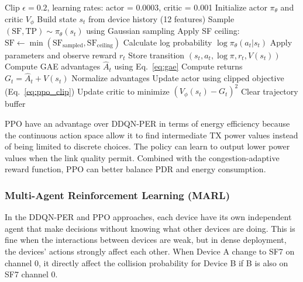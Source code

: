 \documentclass[12pt,a4paper]{article}
\begin{document}
\begin{algorithm}[H]
\caption{PPO ADR Agent}
\label{alg:ppo}
\begin{algorithmic}[1]
\Require Clip $\epsilon = 0.2$, learning rates: actor = 0.0003, critic = 0.001
\State Initialize actor $\pi_\theta$ and critic $V_\phi$
    \State Build state $s_t$ from device history (12 features)
    \State Sample $({\text{SF}}, {\text{TP}}) \sim \pi_\theta(s_t)$ using Gaussian sampling
    \State Apply SF ceiling: $\text{SF} \gets \min(\text{SF}_{\text{sampled}}, \text{SF}_{\text{ceiling}})$
    \State Calculate log probability $\log\pi_\theta(a_t|s_t)$
    \State Apply parameters and observe reward $r_t$
    \State Store transition $(s_t, a_t, \log\pi, r_t, V(s_t))$
        \State Compute GAE advantages $\hat{A}_t$ using Eq.~\ref{eq:gae}
        \State Compute returns $G_t = \hat{A}_t + V(s_t)$
        \State Normalize advantages
        \State Update actor using clipped objective (Eq.~\ref{eq:ppo_clip})
        \State Update critic to minimize $(V_\phi(s_t) - G_t)^2$
        \State Clear trajectory buffer
    \EndIf
\EndFor
\end{algorithmic}
\end{algorithm}


PPO have an advantage over DDQN-PER in terms of energy efficiency because the continuous action space allow it to find intermediate TX power values instead of being limited to discrete choices. The policy can learn to output lower power values when the link quality permit. Combined with the congestion-adaptive reward function, PPO can better balance PDR and energy consumption.


\subsubsection{Multi-Agent Reinforcement Learning (MARL)}
\label{sec:marl}


In the DDQN-PER and PPO approaches, each device have its own independent agent that make decisions without knowing what other devices are doing. This is fine when the interactions between devices are weak, but in dense deployment, the devices' actions strongly affect each other. When Device A change to SF7 on channel 0, it directly affect the collision probability for Device B if B is also on SF7 channel 0.
\end{document}
